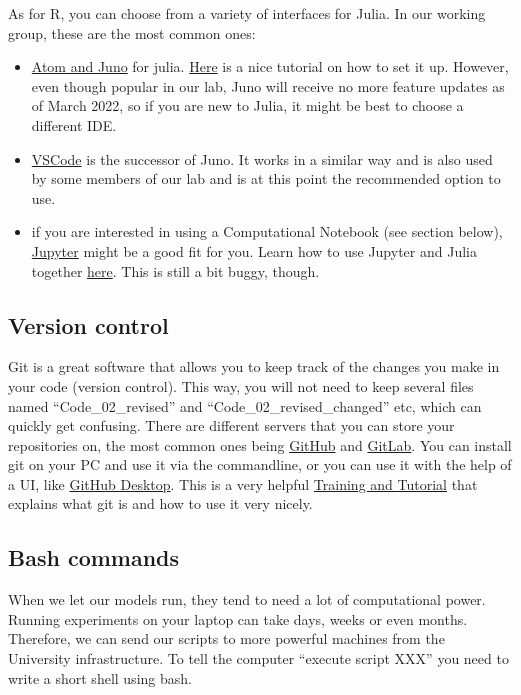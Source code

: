 \documentclass[
]{book}
\begin{document}
As for R, you can choose from a variety of interfaces for Julia. In our
working group, these are the most common ones:

\begin{itemize}
\item
  \href{https://junolab.org/}{Atom and Juno} for julia.
  \href{https://techytok.com/atom-and-juno-setup-for-julia/}{Here} is a
  nice tutorial on how to set it up. However, even though popular in
  our lab, Juno will receive no more feature updates as of March 2022,
  so if you are new to Julia, it might be best to choose a different
  IDE.
\item
  \href{https://www.julia-vscode.org/}{VSCode} is the successor of Juno. It
  works in a similar way and is also used by some members of our lab
  and is at this point the recommended option to use.
\item
  if you are interested in using a Computational Notebook (see section
  below), \href{https://jupyter.org/}{Jupyter} might be a good fit for you.
  Learn how to use Jupyter and Julia together
  \href{https://datatofish.com/add-julia-to-jupyter/}{here}. This is still
  a bit buggy, though.
\end{itemize}

\subsection{Version control}\label{version-control}

Git is a great software that allows you to keep track of the changes you
make in your code (version control). This way, you will not need to keep
several files named ``Code\_02\_revised'' and ``Code\_02\_revised\_changed'' etc,
which can quickly get confusing. There are different servers that you
can store your repositories on, the most common ones being
\href{https://github.com/}{GitHub} and \href{https://about.gitlab.com/}{GitLab}.
You can install git on your PC and use it via the commandline, or you
can use it with the help of a UI, like \href{https://desktop.github.com/}{GitHub
Desktop}. This is a very helpful \href{https://github.com/UnseenWizzard/git_training}{Training
and Tutorial} that
explains what git is and how to use it very nicely.

\subsection{Bash commands}\label{bash-commands}

When we let our models run, they tend to need a lot of computational
power. Running experiments on your laptop can take days, weeks or even
months. Therefore, we can send our scripts to more powerful machines
from the University infrastructure. To tell the computer ``execute script
XXX'' you need to write a short shell using bash.
\end{document}
